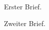 \documentclass{g-brief2}
\begin{document}
\begin{g-brief}
Erster Brief.
\end{g-brief}
\begin{g-brief}
Zweiter Brief.
\end{g-brief}
\end{document}
